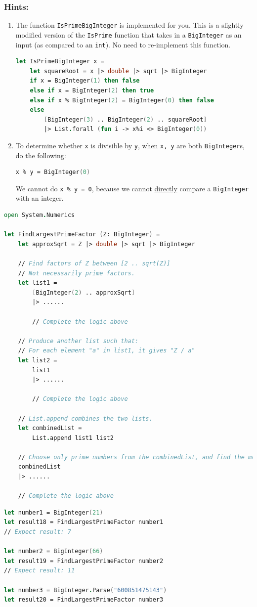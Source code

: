 \documentclass[12pt]{article}
\begin{document}
\subsubsection*{Hints:}
\begin{enumerate}
\item The function \texttt{IsPrimeBigInteger} is implemented for you. This is a slightly modified version of the \texttt{IsPrime} function that takes in a \texttt{BigInteger} as an input (as compared to an \texttt{int}). No need to re-implement this function.

\begin{lstlisting}[language=FSharp]
let IsPrimeBigInteger x =
    let squareRoot = x |> double |> sqrt |> BigInteger 
    if x = BigInteger(1) then false
    else if x = BigInteger(2) then true
    else if x % BigInteger(2) = BigInteger(0) then false
    else 
        [BigInteger(3) .. BigInteger(2) .. squareRoot]
        |> List.forall (fun i -> x%i <> BigInteger(0))
\end{lstlisting}
\item To determine whether \texttt{x} is divisible by \texttt{y}, when \texttt{x, y} are both \texttt{BigInteger}s, do the following:
\begin{lstlisting}[language=FSharp]
x % y = BigInteger(0)
\end{lstlisting}
We cannot do \texttt{x \% y = 0}, because we cannot \underline{directly} compare a \texttt{BigInteger} with an integer.
\end{enumerate}
\begin{lstlisting}[language=FSharp]
open System.Numerics

let FindLargestPrimeFactor (Z: BigInteger) =
    let approxSqrt = Z |> double |> sqrt |> BigInteger

    // Find factors of Z between [2 .. sqrt(Z)]
    // Not necessarily prime factors.
    let list1 =
        [BigInteger(2) .. approxSqrt]
        |> ......

        // Complete the logic above

    // Produce another list such that:
    // For each element "a" in list1, it gives "Z / a"
    let list2 =
        list1
        |> ......

        // Complete the logic above

    // List.append combines the two lists.
    let combinedList =
        List.append list1 list2

    // Choose only prime numbers from the combinedList, and find the maximum using List.max
    combinedList
    |> ......

    // Complete the logic above
\end{lstlisting}
\begin{lstlisting}[language=FSharp]
let number1 = BigInteger(21)
let result18 = FindLargestPrimeFactor number1  
// Expect result: 7

let number2 = BigInteger(66)
let result19 = FindLargestPrimeFactor number2
// Expect result: 11

let number3 = BigInteger.Parse("600851475143")
let result20 = FindLargestPrimeFactor number3
\end{lstlisting}
\end{document}
